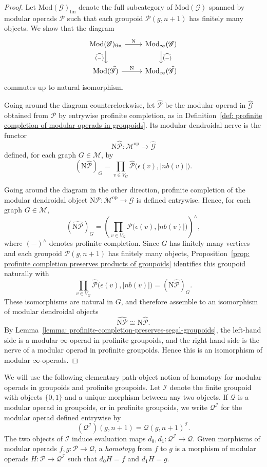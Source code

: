 \documentclass{amsart}
\newcommand{\bM}{\mathscr{M}}
\newcommand{\calQ}{\mathcal{Q}}
\newcommand{\Grpd}{\mathscr{G}}
\newcommand{\calP}{\mathcal{P}}
\newcommand{\Mod}{\mathrm{Mod}}
\newcommand{\op}{\mathrm{op}}
\newcommand{\nerve}{\mathrm{N}}
\newcommand{\nb}{nb}
\theoremstyle{definition}
\numberwithin{equation}{section}
\begin{document}
\begin{proof}
Let $\Mod(\Grpd)_{\mathrm{fin}}$ denote the full subcategory of $\Mod(\Grpd)$ spanned by modular operads $\calP$ such that each groupoid $\calP(g,n+1)$ has finitely many objects. We show that the diagram
\[
\begin{tikzcd}
\Mod(\Grpd)_{\mathrm{fin}} \arrow[d, "\widehat{(-)}"'] \arrow[r, "\nerve"] 
& \Mod_{\infty}(\Grpd) \arrow[d, "\widehat{(-)}"] \\
\Mod(\widehat{\Grpd}) \arrow[r, "\nerve"] 
& \Mod_{\infty}(\widehat{\Grpd})
\end{tikzcd}
\]
commutes up to natural isomorphism.

Going around the diagram counterclockwise, let $\widehat{\calP}$ be the modular operad in $\widehat{\Grpd}$ obtained from $\calP$ by entrywise profinite completion, as in Definition~\ref{def: profinite completion of modular operads in groupoids}. Its modular dendroidal nerve is the functor
\[
\nerve\widehat{\calP}:\bM^{\op}\longrightarrow \widehat{\Grpd}
\]
defined, for each graph $G\in\bM$, by
\[
(\nerve\widehat{\calP})_G
=
\prod_{v\in V_G}
\widehat{\calP}\bigl(\epsilon(v),|\nb(v)|\bigr).
\]

Going around the diagram in the other direction, profinite completion of the modular dendroidal object
$\nerve\calP:\bM^{\op}\to\Grpd$ is defined entrywise. Hence, for each graph $G\in\bM$,
\[
(\widehat{\nerve\calP})_G
=
\left(
\prod_{v\in V_G}
\calP\bigl(\epsilon(v),|\nb(v)|\bigr)
\right)^{\wedge},
\]
where $(-)^{\wedge}$ denotes profinite completion. Since $G$ has finitely many vertices and each groupoid $\calP(g,n+1)$ has finitely many objects, Proposition~\ref{prop: profinite completion preserves products of groupoids} identifies this groupoid naturally with
\[
\prod_{v\in V_G}
\widehat{\calP}\bigl(\epsilon(v),|\nb(v)|\bigr)
=
(\nerve\widehat{\calP})_G.
\]
These isomorphisms are natural in $G$, and therefore assemble to an isomorphism of modular dendroidal objects
\[
\widehat{\nerve\calP}\cong \nerve\widehat{\calP}.
\]
By Lemma~\ref{lemma: profinite-completion-preserves-segal-groupoids}, the left-hand side is a modular $\infty$-operad in profinite groupoids, and the right-hand side is the nerve of a modular operad in profinite groupoids. Hence this is an isomorphism of modular $\infty$-operads.
\end{proof}


We will use the following elementary path-object notion of homotopy for modular operads in groupoids and profinite groupoids. Let $\mathscr I$ denote the finite groupoid with objects $\{0,1\}$ and a unique morphism between any two objects. If $\calQ$ is a modular operad in groupoids, or in profinite groupoids, we write $\calQ^{\mathscr I}$ for the modular operad defined entrywise by
\[
(\calQ^{\mathscr I})(g,n+1)=\calQ(g,n+1)^{\mathscr I}.
\]
The two objects of $\mathscr I$ induce evaluation maps $d_0,d_1\colon \calQ^{\mathscr I}\to\calQ$. Given morphisms of modular operads $f,g\colon \calP\to\calQ$, a \emph{homotopy} from $f$ to $g$ is a morphism of modular operads $H\colon\calP\to\calQ^{\mathscr I}$ such that $d_0H=f$ and $d_1H=g$.
\end{document}

